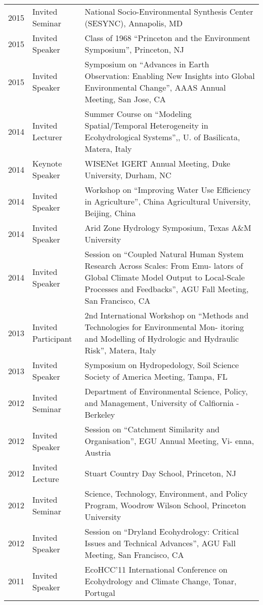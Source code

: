 \begin{longtable}{l p{3.0cm} p{11.5cm}}
2015 & Invited Seminar & National Socio-Environmental Synthesis Center (SESYNC), Annapolis, MD \\
2015 & Invited Speaker & Class of 1968 ``Princeton and the Environment Symposium'', Princeton, NJ \\
2015 & Invited Speaker & Symposium on ``Advances in Earth Observation: Enabling New Insights into Global Environmental Change'', AAAS Annual Meeting, San Jose, CA \\
2014 & Invited Lecturer & Summer Course on ``Modeling Spatial/Temporal Heterogeneity in Ecohydrological Systems'',, U. of Basilicata, Matera, Italy \\
2014 & Keynote Speaker & WISENet IGERT Annual Meeting, Duke University, Durham, NC \\
2014 & Invited Speaker & Workshop on ``Improving Water Use Efficiency in Agriculture'', China Agricultural University, Beijing, China \\
2014 & Invited Speaker & Arid Zone Hydrology Symposium, Texas A\&M University \\
2014 & Invited Speaker & Session on ``Coupled Natural Human System Research Across Scales: From Emu- lators of Global Climate Model Output to Local-Scale Processes and Feedbacks'', AGU Fall Meeting, San Francisco, CA  \\
2013 & Invited Participant & 2nd International Workshop on ``Methods and Technologies for Environmental Mon- itoring and Modelling of Hydrologic and Hydraulic Risk'', Matera, Italy \\
2013 & Invited Speaker & Symposium on Hydropedology, Soil Science Society of America Meeting, Tampa, FL \\
2012 & Invited Seminar & Department of Environmental Science, Policy, and Management, University of Calfiornia - Berkeley \\
2012 & Invited Speaker & Session on ``Catchment Similarity and Organisation'', EGU Annual Meeting, Vi- enna, Austria \\
2012 & Invited Lecture & Stuart Country Day School, Princeton, NJ \\
2012 & Invited Seminar & Science, Technology, Environment, and Policy Program, Woodrow Wilson School, Princeton University \\
2012 & Invited Speaker & Session on ``Dryland Ecohydrology: Critical Issues and Technical Advances'', AGU Fall Meeting, San Francisco, CA \\
2011 & Invited Speaker & EcoHCC'11 International Conference on Ecohydrology and Climate Change, Tonar, Portugal \\

\end{longtable}
